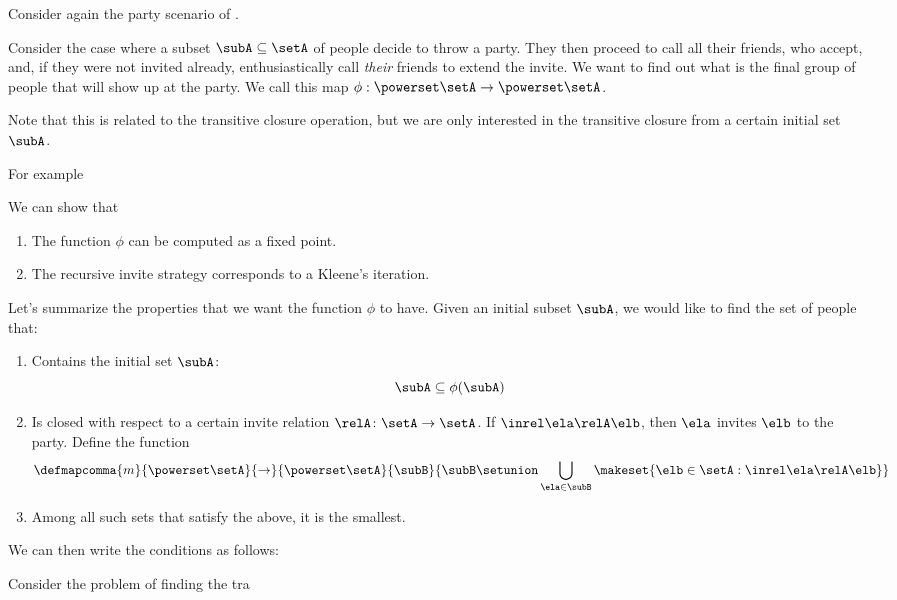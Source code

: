 \begin{example}
    Consider again the party scenario of \XXX.

    Consider the case where a subset $\subA \subseteq \setA$ of people decide to throw a party.
    They then proceed to call all their friends, who accept, and,
    if they were not invited already, enthusiastically call \emph{their} friends to extend the invite.
    We want to find out what is the final group of people that will show up at the party.
    We call this map $\phi: \powerset \setA \to \powerset \setA$.

    Note that this is related to the transitive closure operation, but we are only interested in the transitive closure from a certain initial set $\subA$.

    For example 

    We can show that
    \begin{enumerate}
        \item The function $\phi$ can be computed as a fixed point.
        \item The recursive invite strategy corresponds to a Kleene's iteration.
    \end{enumerate}

    Let's summarize the properties that we want the function $\phi$ to have.
    Given an initial subset $\subA$, we would like to find the set of people that:
    \begin{enumerate}
        \item Contains the initial set $\subA$:
              \begin{equation}
                  \subA \subseteq \phi(\subA )
              \end{equation}
        \item Is closed with respect to a certain invite relation $\relA \colon \setA \to \setA$.
              If $\inrel \ela \relA \elb$, then $\ela$ invites $\elb$ to the party.
              Define the function
              \begin{equation}
                  \defmapcomma{m}{\powerset \setA}{\to}{\powerset \setA
                  }{
                      \subB
                  }{
                      \subB \setunion \bigcup_{\ela \in \subB} \makeset{ \elb \in \setA : \inrel \ela \relA \elb}
                  }
              \end{equation}

        \item Among all such sets that satisfy the above, it is the smallest.
    \end{enumerate}

    We can then write the conditions as follows:

    Consider the problem of finding the tra

\end{example}